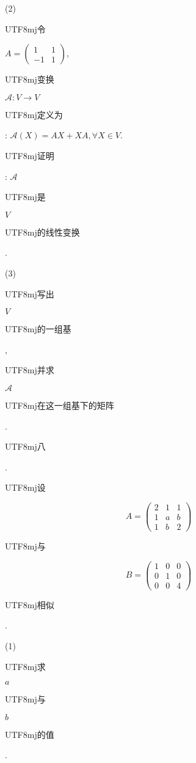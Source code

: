\documentclass[10pt]{article}
\begin{document}
(2) \begin{CJK}{UTF8}{mj}令\end{CJK} $A=\left(\begin{array}{cc}1 & 1 \\ -1 & 1\end{array}\right)$, \begin{CJK}{UTF8}{mj}变换\end{CJK} $\mathscr{A}: V \rightarrow V$ \begin{CJK}{UTF8}{mj}定义为\end{CJK}: $\mathscr{A}(X)=A X+X A, \forall X \in V$. \begin{CJK}{UTF8}{mj}证明\end{CJK}: $\mathscr{A}$ \begin{CJK}{UTF8}{mj}是\end{CJK} $V$ \begin{CJK}{UTF8}{mj}的线性变换\end{CJK}.

(3) \begin{CJK}{UTF8}{mj}写出\end{CJK} $V$ \begin{CJK}{UTF8}{mj}的一组基\end{CJK}, \begin{CJK}{UTF8}{mj}并求\end{CJK} $\mathscr{A}$ \begin{CJK}{UTF8}{mj}在这一组基下的矩阵\end{CJK}.

\begin{CJK}{UTF8}{mj}八\end{CJK}. \begin{CJK}{UTF8}{mj}设\end{CJK}
$$
A=\left(\begin{array}{lll}
2 & 1 & 1 \\
1 & a & b \\
1 & b & 2
\end{array}\right)
$$
\begin{CJK}{UTF8}{mj}与\end{CJK}
$$
B=\left(\begin{array}{lll}
1 & 0 & 0 \\
0 & 1 & 0 \\
0 & 0 & 4
\end{array}\right)
$$
\begin{CJK}{UTF8}{mj}相似\end{CJK}.

(1) \begin{CJK}{UTF8}{mj}求\end{CJK} $a$ \begin{CJK}{UTF8}{mj}与\end{CJK} $b$ \begin{CJK}{UTF8}{mj}的值\end{CJK}.
\end{document}
